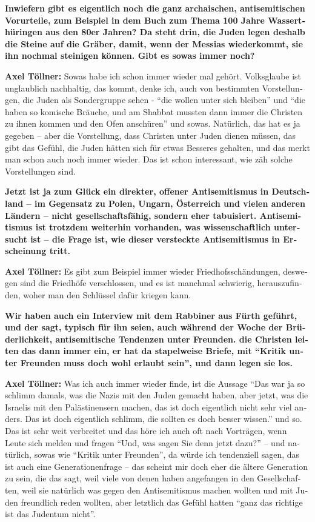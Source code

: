 \begin{otherlanguage}{ngerman}
\textbf{Inwiefern gibt es eigentlich noch die ganz archaischen, antisemitischen Vorurteile, zum Beispiel in dem Buch zum Thema 100 Jahre Wasserthüringen aus den 80er Jahren? Da steht drin, die Juden legen deshalb die Steine auf die Gräber, damit, wenn der Messias wiederkommt, sie ihn nochmal steinigen können. Gibt es sowas immer noch?} 

\textbf{Axel Töllner:} Sowas habe ich schon immer wieder mal gehört. Volksglaube ist unglaublich nachhaltig, das kommt, denke ich, auch von bestimmten Vorstellungen, die Juden als Sondergruppe sehen - "`die wollen unter sich bleiben"' und "`die haben so komische Bräuche, und am Shabbat mussten dann immer die Christen zu ihnen kommen und den Ofen anschüren"' und sowas. Natürlich, das hat es ja gegeben – aber die Vorstellung, dass Christen unter Juden dienen müssen, das gibt das Gefühl, die Juden hätten sich für etwas Besseres gehalten, und das merkt man schon auch noch immer wieder. Das ist schon interessant, wie zäh solche Vorstellungen sind. 

\textbf{Jetzt ist ja zum Glück ein direkter, offener Antisemitismus in Deutschland – im Gegensatz zu Polen, Ungarn, Österreich und vielen anderen Ländern – nicht gesellschaftsfähig, sondern eher tabuisiert. Antisemitismus ist trotzdem weiterhin vorhanden, was wissenschaftlich untersucht ist – die Frage ist, wie dieser versteckte Antisemitismus in Erscheinung tritt.} 

\textbf{Axel Töllner:} Es gibt zum Beispiel immer wieder Friedhofsschändungen, deswegen sind die Friedhöfe verschlossen, und es ist manchmal schwierig, herauszufinden, woher man den Schlüssel dafür kriegen kann.  

\textbf{Wir haben auch ein Interview mit dem Rabbiner aus Fürth geführt, und der sagt, typisch für ihn seien, auch während der Woche der Brüderlichkeit, antisemitische Tendenzen unter Freunden. die Christen leiten das dann immer ein, er hat da stapelweise Briefe, mit "`Kritik unter Freunden muss doch wohl erlaubt sein"', und dann legen sie los.} 

\textbf{Axel Töllner:} Was ich auch immer wieder finde, ist die Aussage "`Das war ja so schlimm damals, was die Nazis mit den Juden gemacht haben, aber jetzt, was die Israelis mit den Palästinensern machen, das ist doch eigentlich nicht sehr viel anders. Das ist doch eigentlich schlimm, die sollten es doch besser wissen."' und so. Das ist sehr weit verbreitet und das höre ich auch oft nach Vorträgen, wenn Leute sich melden und fragen "`Und, was sagen Sie denn jetzt dazu?"' – und natürlich, sowas wie "`Kritik unter Freunden"', da würde ich tendenziell sagen, das ist auch eine Generationenfrage – das scheint mir doch eher die ältere Generation zu sein, die das sagt, weil viele von denen haben angefangen in den Gesellschaften, weil sie natürlich was gegen den Antisemitismus machen wollten und mit Juden freundlich reden wollten, aber letztlich das Gefühl hatten "`ganz das richtige ist das Judentum nicht"'. 


\end{otherlanguage}
